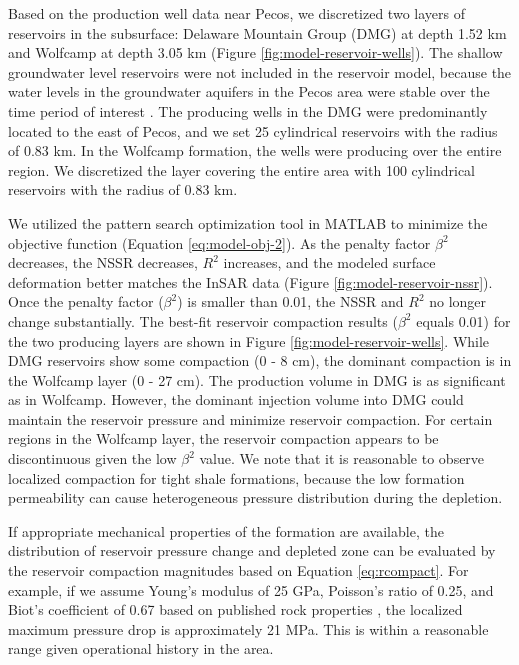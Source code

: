 \documentclass{utexasthesis}
\begin{document}
Based on the production well data near Pecos, we discretized two layers of reservoirs in the subsurface: Delaware Mountain Group (DMG) at depth 1.52 km and Wolfcamp at depth 3.05 km (Figure \ref{fig:model-reservoir-wells}). The shallow groundwater level reservoirs were not included in the reservoir model, because the water levels in the groundwater aquifers in the Pecos area were stable over the time period of interest \cite{deng2020surface}. The producing wells in the DMG were predominantly located to the east of Pecos, and we set 25 cylindrical reservoirs with the radius of 0.83 km. In the Wolfcamp formation, the wells were producing over the entire region. We discretized the layer covering the entire area with 100 cylindrical reservoirs with the radius of 0.83 km.  

We utilized the pattern search optimization tool in MATLAB to minimize the objective function (Equation \eqref{eq:model-obj-2}). As the penalty factor $\beta^2$ decreases, the NSSR decreases, $ R^2 $ increases, and the modeled surface deformation better matches the InSAR data (Figure \ref{fig:model-reservoir-nssr}). Once the penalty factor ($ \beta^2 $) is smaller than 0.01, the NSSR and $ R^2 $ no longer change substantially. The best-fit reservoir compaction results ($ \beta^2 $ equals 0.01) for the two producing layers are shown in Figure \ref{fig:model-reservoir-wells}. While DMG reservoirs show some compaction (0 - 8 cm), the dominant compaction is in the Wolfcamp layer (0 - 27 cm). The production volume in DMG is as significant as in Wolfcamp. However, the dominant injection volume into DMG could maintain the reservoir pressure and minimize reservoir compaction. For certain regions in the Wolfcamp layer, the reservoir compaction appears to be discontinuous given the low $ \beta^2 $ value. We note that it is reasonable to observe localized compaction for tight shale formations, because the low formation permeability can cause heterogeneous pressure distribution during the depletion.

If appropriate mechanical properties of the formation are available, the distribution of reservoir pressure change and depleted zone can be evaluated by the reservoir compaction magnitudes based on Equation \eqref{eq:rcompact}. For example, if we assume Young’s modulus of 25 GPa, Poisson’s ratio of 0.25, and Biot’s coefficient of 0.67 based on published rock properties \cite{Shukla2013NanoindentationStudiesShales}  \cite{Shukla2013, Xu2015analysis}, the localized maximum pressure drop is approximately 21 MPa. This is within a reasonable range given operational history in the area.
\end{document}
